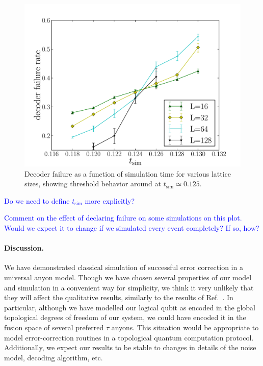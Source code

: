 \documentclass[aps, prl, letterpaper, twocolumn, superscriptaddress, notitlepage, 10pt]{revtex4-1}
\newcommand{\cggb}[1]{\textcolor{blue}{#1}}
\begin{document}
\begin{figure}[th!]
\begin{center}
	\includegraphics[width=\columnwidth]{anyons-kyle.pdf}
\caption{Decoder failure as a function of simulation time for various lattice sizes, showing 
threshold behavior around at $t_{\mathrm{sim}}\simeq 0.125$.}
\label{f:threshold}
\end{center}
\end{figure}

\cggb{Do we need to define $t_{\mathrm{sim}}$ more explicitly?}
	
\cggb{Comment on the effect of declaring failure on some simulations on this plot. Would 
we expect it to change if we simulated every event completely? If so, how?}

\paragraph{Discussion.}

We have demonstrated classical simulation of successful error correction in a universal anyon 
model. Though we have chosen several properties of our model and simulation in a 
convenient way for simplicity, we think it very unlikely that they will affect the qualitative 
results, similarly to the results of Ref.~\cite{Brell2013}. In particular, although we have 
modelled our logical qubit as encoded in the global topological degrees of freedom of our 
system, we could have encoded it in the fusion space of several preferred $\tau$ anyons. 
This situation would be appropriate to model error-correction routines in a topological 
quantum computation protocol. Additionally, we expect our results to be stable to changes 
in details of the noise model, decoding algorithm, etc.
	
\end{document}

